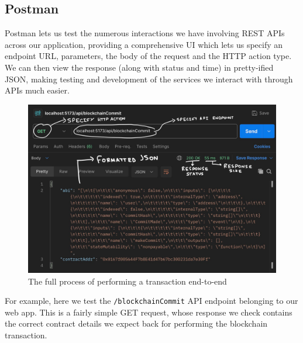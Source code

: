 \documentclass[12pt,a4paper]{article}
\begin{document}
\subsection{Postman}
Postman lets us test the numerous interactions we have involving REST APIs across our application, providing a comprehensive UI which lets us specify an endpoint URL, parameters, the body of the request and the HTTP action type. We can then view the response (along with status and time) in pretty-ified JSON, making testing and development of the services we interact with through APIs much easier. 
\begin{figure}[H]
    \centering
    \includegraphics[scale=0.4]{postman1.png}
    \caption{The full process of performing a transaction end-to-end}
\end{figure}
\noindent For example, here we test the \verb|/blockchainCommit| API endpoint belonging to our web app. This is a fairly simple GET request, whose response we check contains the correct contract details we expect back for performing the blockchain transaction.
\end{document}
